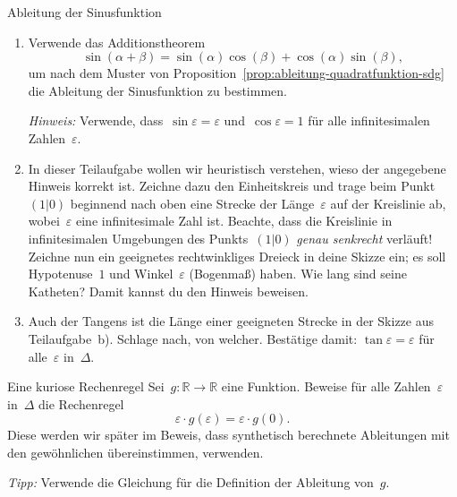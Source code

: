 \documentclass[twoside]{../zirkelblatt}
\newcommand{\RR}{\mathbb{R}}
\theoremstyle{definition}
\theoremstyle{plain}
\theoremstyle{remark}
\begin{document}
\begin{aufgabeShaded}{Ableitung der Sinusfunktion}
\begin{enumerate}
\item Verwende das Additionstheorem
\[ \sin(\alpha+\beta) = \sin(\alpha)\cos(\beta) + \cos(\alpha)\sin(\beta), \]
um nach dem Muster von Proposition~\ref{prop:ableitung-quadratfunktion-sdg} die
Ableitung der Sinusfunktion zu bestimmen.

\emph{Hinweis:} Verwende, dass~$\sin\varepsilon = \varepsilon$
und~$\cos\varepsilon = 1$ für alle infinitesimalen Zahlen~$\varepsilon$.

\item In dieser Teilaufgabe wollen wir heuristisch verstehen, wieso der
angegebene Hinweis korrekt ist. Zeichne dazu den Einheitskreis und trage beim
Punkt~$(1|0)$ beginnend nach oben eine Strecke der Länge~$\varepsilon$ auf der
Kreislinie ab, wobei~$\varepsilon$ eine infinitesimale Zahl ist. Beachte, dass
die Kreislinie in infinitesimalen Umgebungen des Punkts~$(1|0)$ \emph{genau
senkrecht} verläuft! Zeichne nun ein geeignetes rechtwinkliges Dreieck in deine
Skizze ein; es soll Hypotenuse~$1$ und Winkel~$\varepsilon$ (Bogenmaß) haben. Wie lang
sind seine Katheten? Damit kannst du den Hinweis beweisen.

\item Auch der Tangens ist die Länge einer geeigneten Strecke in der Skizze aus
Teilaufgabe~b). Schlage nach, von welcher. Bestätige damit: $\tan\varepsilon =
\varepsilon$ für alle~$\varepsilon$ in~$\Delta$.
\end{enumerate}
\end{aufgabeShaded}

\begin{aufgabeShaded}{Eine kuriose Rechenregel}
\label{aufg:kurios}
Sei~$g : \RR \to \RR$ eine Funktion. Beweise für alle Zahlen~$\varepsilon$
in~$\Delta$ die Rechenregel
\[ \varepsilon \cdot g(\varepsilon) = \varepsilon \cdot g(0). \]
Diese werden wir später im Beweis, dass synthetisch berechnete Ableitungen mit
den gewöhnlichen übereinstimmen, verwenden.

\emph{Tipp:} Verwende die Gleichung für die Definition der Ableitung von~$g$.
\end{aufgabeShaded}
\end{document}
